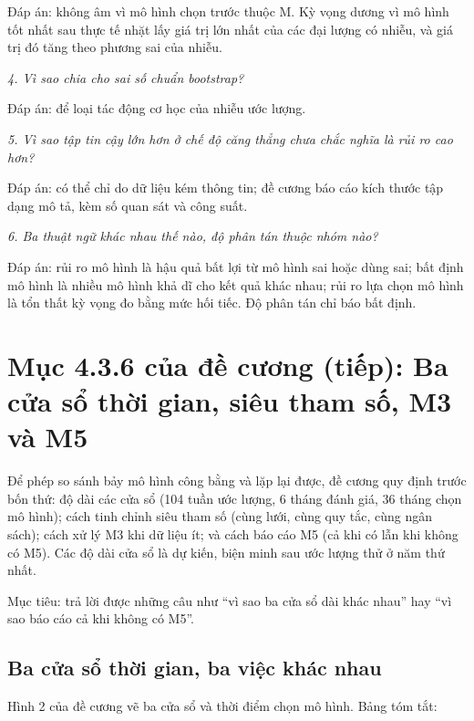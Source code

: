 Đáp án: không âm vì mô hình chọn trước thuộc M. Kỳ vọng dương vì mô hình tốt nhất sau thực tế nhặt lấy giá trị lớn nhất của các đại lượng có nhiễu, và giá trị đó tăng theo phương sai của nhiễu.

{\itshape 4. Vì sao chia cho sai số chuẩn bootstrap?\par}

Đáp án: để loại tác động cơ học của nhiễu ước lượng.

{\itshape 5. Vì sao tập tin cậy lớn hơn ở chế độ căng thẳng chưa chắc nghĩa là rủi ro cao hơn?\par}

Đáp án: có thể chỉ do dữ liệu kém thông tin; đề cương báo cáo kích thước tập dạng mô tả, kèm số quan sát và công suất.

{\itshape 6. Ba thuật ngữ khác nhau thế nào, độ phân tán thuộc nhóm nào?\par}

Đáp án: rủi ro mô hình là hậu quả bất lợi từ mô hình sai hoặc dùng sai; bất định mô hình là nhiều mô hình khả dĩ cho kết quả khác nhau; rủi ro lựa chọn mô hình là tổn thất kỳ vọng đo bằng mức hối tiếc. Độ phân tán chỉ báo bất định.

\chapter{Mục 4.3.6 của đề cương (tiếp): Ba cửa sổ thời gian, siêu tham số, M3 và M5}

Để phép so sánh bảy mô hình công bằng và lặp lại được, đề cương quy định trước bốn thứ: độ dài các cửa sổ (104 tuần ước lượng, 6 tháng đánh giá, 36 tháng chọn mô hình); cách tinh chỉnh siêu tham số (cùng lưới, cùng quy tắc, cùng ngân sách); cách xử lý M3 khi dữ liệu ít; và cách báo cáo M5 (cả khi có lẫn khi không có M5). Các độ dài cửa sổ là dự kiến, biện minh sau ước lượng thử ở năm thứ nhất.

Mục tiêu: trả lời được những câu như “vì sao ba cửa sổ dài khác nhau” hay “vì sao báo cáo cả khi không có M5”.

\section{Ba cửa sổ thời gian, ba việc khác nhau}

Hình 2 của đề cương vẽ ba cửa sổ và thời điểm chọn mô hình. Bảng tóm tắt:

